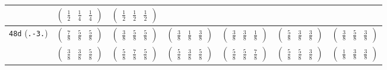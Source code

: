 \documentclass[fleqn,9pt,landscape]{jsarticle}
\begin{document}
\begin{center}
\begin{longtable}{ccccccc}
& $ \begin{pmatrix} \frac{1}{2} & \frac{1}{4} & \frac{1}{4} \end{pmatrix} $ & $ \begin{pmatrix} \frac{1}{2} & \frac{1}{2} & \frac{1}{2} \end{pmatrix} $ & $  $ & $  $ & $  $ & $  $ \\ \hline
{\tt 48d} ({\tt .-3.}) & $ \begin{pmatrix} \frac{7}{8} & \frac{5}{8} & \frac{5}{8} \end{pmatrix} $ & $ \begin{pmatrix} \frac{3}{8} & \frac{5}{8} & \frac{5}{8} \end{pmatrix} $ & $ \begin{pmatrix} \frac{3}{8} & \frac{1}{8} & \frac{3}{8} \end{pmatrix} $ & $ \begin{pmatrix} \frac{3}{8} & \frac{3}{8} & \frac{1}{8} \end{pmatrix} $ & $ \begin{pmatrix} \frac{5}{8} & \frac{3}{8} & \frac{3}{8} \end{pmatrix} $ & $ \begin{pmatrix} \frac{3}{8} & \frac{5}{8} & \frac{3}{8} \end{pmatrix} $ \\
& $ \begin{pmatrix} \frac{3}{8} & \frac{3}{8} & \frac{5}{8} \end{pmatrix} $ & $ \begin{pmatrix} \frac{5}{8} & \frac{7}{8} & \frac{5}{8} \end{pmatrix} $ & $ \begin{pmatrix} \frac{5}{8} & \frac{3}{8} & \frac{5}{8} \end{pmatrix} $ & $ \begin{pmatrix} \frac{5}{8} & \frac{5}{8} & \frac{7}{8} \end{pmatrix} $ & $ \begin{pmatrix} \frac{5}{8} & \frac{5}{8} & \frac{3}{8} \end{pmatrix} $ & $ \begin{pmatrix} \frac{1}{8} & \frac{3}{8} & \frac{3}{8} \end{pmatrix} $ \\ \hline

\end{longtable}
\end{center}
\end{document}
